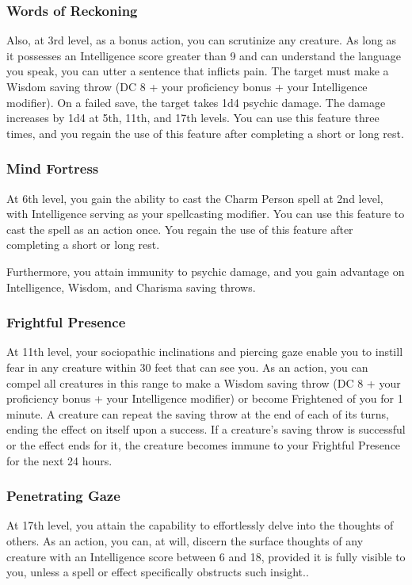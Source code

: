 \subsubsection{Words of Reckoning}
Also, at 3rd level, as a bonus action, you can scrutinize any creature. As long as it possesses an Intelligence score greater than 9 and can understand the language you speak, you can utter a sentence that inflicts pain. The target must make a Wisdom saving throw (DC 8 + your proficiency bonus + your Intelligence modifier). On a failed save, the target takes 1d4 psychic damage. The damage increases by 1d4 at 5th, 11th, and 17th levels. You can use this feature three times, and you regain the use of this feature after completing a short or long rest.
\subsubsection{Mind Fortress} 
At 6th level, you gain the ability to cast the Charm Person spell at 2nd level, with Intelligence serving as your spellcasting modifier. You can use this feature to cast the spell as an action once. You regain the use of this feature after completing a short or long rest.

Furthermore, you attain immunity to psychic damage, and you gain advantage on Intelligence, Wisdom, and Charisma saving throws.
\subsubsection{Frightful Presence}
At 11th level, your sociopathic inclinations and piercing gaze enable you to instill fear in any creature within 30 feet that can see you. As an action, you can compel all creatures in this range to make a Wisdom saving throw (DC 8 + your proficiency bonus + your Intelligence modifier) or become Frightened of you for 1 minute. A creature can repeat the saving throw at the end of each of its turns, ending the effect on itself upon a success. If a creature's saving throw is successful or the effect ends for it, the creature becomes immune to your Frightful Presence for the next 24 hours.
\subsubsection{Penetrating Gaze}
At 17th level, you attain the capability to effortlessly delve into the thoughts of others. As an action, you can, at will, discern the surface thoughts of any creature with an Intelligence score between 6 and 18, provided it is fully visible to you, unless a spell or effect specifically obstructs such insight..
